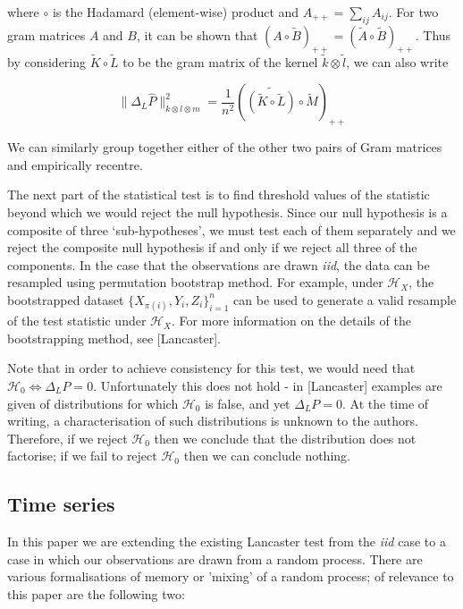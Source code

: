 \documentclass[]{article}
\begin{document}
where $\circ$ is the Hadamard (element-wise) product and $A_{++} = \sum_{ij}A_{ij}$. For two gram matrices $A$ and $B$, it can be shown that $\left(A\circ\tilde{B}\right)_{++} = \left(\tilde{A}\circ\tilde{B}\right)_{++}$. Thus by considering $\tilde{K}\circ \tilde{L}$ to be the gram matrix of the kernel $\tilde{k}\otimes\tilde{l}$, we can also write

\begin{equation}\label{eqn:lancaster2}
\|\Delta_L\hat{P}\|_{k\otimes l \otimes m}^2 = \frac{1}{n^2}\left(\widetilde{(\tilde{K}\circ\tilde{L})}\circ\tilde{M}\right)_{++}
\end{equation}

We can similarly group together either of the other two pairs of Gram matrices and empirically recentre.


The next part of the statistical test is to find threshold values of the statistic beyond which we would reject the null hypothesis. Since our null hypothesis is a composite of three `sub-hypotheses', we must test each of them separately and we reject the composite null hypothesis if and only if we reject all three of the components. In the case that the observations are drawn \emph{iid}, the data can be resampled using permutation bootstrap method. For example, under $\mathcal{H}_X$, the bootstrapped dataset $\{X_{\pi(i)},Y_i,Z_i \}_{i=1}^n$ can be used to generate a valid resample of the test statistic under $\mathcal{H}_X$. For more information on the details of the bootstrapping method, see [Lancaster].

Note that in order to achieve consistency for this test, we would need that $\mathcal{H}_0 \iff \Delta_LP = 0$. Unfortunately this does not hold - in [Lancaster] examples are given of distributions for which $\mathcal{H}_0$ is false, and yet $\Delta_LP = 0$. At the time of writing, a characterisation of such distributions is unknown to the authors. Therefore, if we reject $\mathcal{H}_0$ then we conclude that the distribution does not factorise; if we fail to reject $\mathcal{H}_0$ then we can conclude nothing.

\subsection{Time series}
In this paper we are extending the existing Lancaster test from the \emph{iid} case to a case in which our observations are drawn from a random process. There are various formalisations of memory or 'mixing' of a random process; of relevance to this paper are the following two:
\end{document}
